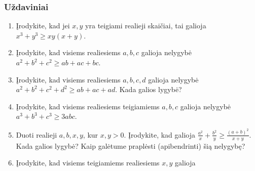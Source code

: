 \subsubsection{Uždaviniai}

\begin{enumerate}
  \item Įrodykite, kad jei $x,y$ yra teigiami realieji skaičiai, tai
    galioja $x^3+y^3\geq xy(x+y)$.
  \item Įrodykite, kad visiems realiesiems $a,b,c$ galioja nelygybė
    $a^2+b^2+c^2\geq ab+ac+bc$.
  \item Įrodykite, kad visiems realiesiems $a,b,c,d$ galioja nelygybė
    $a^2+b^2+c^2+d^2\geq ab+ac+ad$. Kada galios lygybė?
  \item Įrodykite, kad visiems realiesiems teigiamiems $a,b,c$ galioja
    nelygybė $a^3+b^3+c^3 \geq 3abc$.
  \item Duoti realieji $a,b,x,y$, kur $x,y>0$. Įrodykite, kad galioja
    $\frac{a^2}{x}+\frac{b^2}{y}\geq\frac{(a+b)^2}{x+y}$. Kada galios
    lygybė? Kaip galėtume praplėsti (apibendrinti) šią nelygybę?
  \item Įrodykite, kad visiems teigiamiems realiesiems $x,y$ galioja

\end{enumerate}
